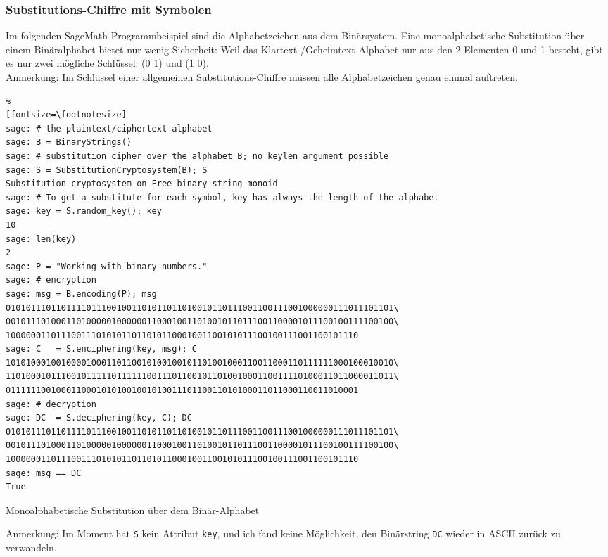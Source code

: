 \begin{refsegment}
\subsubsection{Substitutions-Chiffre mit Symbolen}

Im folgenden SageMath-Programmbeispiel sind die Alphabetzeichen aus dem Binärsystem.
Eine monoalphabetische Substitution über einem Binäralphabet bietet nur wenig
Sicherheit: Weil das Klartext-/Geheimtext-Alphabet nur aus den 2 Elementen
0 und 1 besteht, gibt es nur zwei mögliche Schlüssel: (0 1) und (1 0). \\
Anmerkung: Im Schlüssel einer allgemeinen Substitutions-Chiffre müssen
alle Alphabetzeichen genau einmal auftreten.

\begin{sagecode}
\begin{Verbatim}%
[fontsize=\footnotesize]
sage: # the plaintext/ciphertext alphabet
sage: B = BinaryStrings()
sage: # substitution cipher over the alphabet B; no keylen argument possible
sage: S = SubstitutionCryptosystem(B); S
Substitution cryptosystem on Free binary string monoid
sage: # To get a substitute for each symbol, key has always the length of the alphabet
sage: key = S.random_key(); key
10
sage: len(key)
2
sage: P = "Working with binary numbers."
sage: # encryption
sage: msg = B.encoding(P); msg
01010111011011110111001001101011011010010110111001100111001000000111011101101\
00101110100011010000010000001100010011010010110111001100001011100100111100100\
1000000110111001110101011011010110001001100101011100100111001100101110
sage: C   = S.enciphering(key, msg); C
10101000100100001000110110010100100101101001000110011000110111111000100010010\
11010001011100101111101111110011101100101101001000110011110100011011000011011\
0111111001000110001010100100101001110110011010100011011000110011010001
sage: # decryption
sage: DC  = S.deciphering(key, C); DC
01010111011011110111001001101011011010010110111001100111001000000111011101101\
00101110100011010000010000001100010011010010110111001100001011100100111100100\
1000000110111001110101011011010110001001100101011100100111001100101110
sage: msg == DC
True
\end{Verbatim}
\caption{Monoalphabetische Substitution über dem Binär-Alphabet}
\end{sagecode}

Anmerkung: Im Moment hat \verb!S! kein Attribut \verb!key!, und ich fand
keine Möglichkeit, den Binärstring \verb!DC! wieder in ASCII zurück zu verwandeln.



\end{refsegment}
